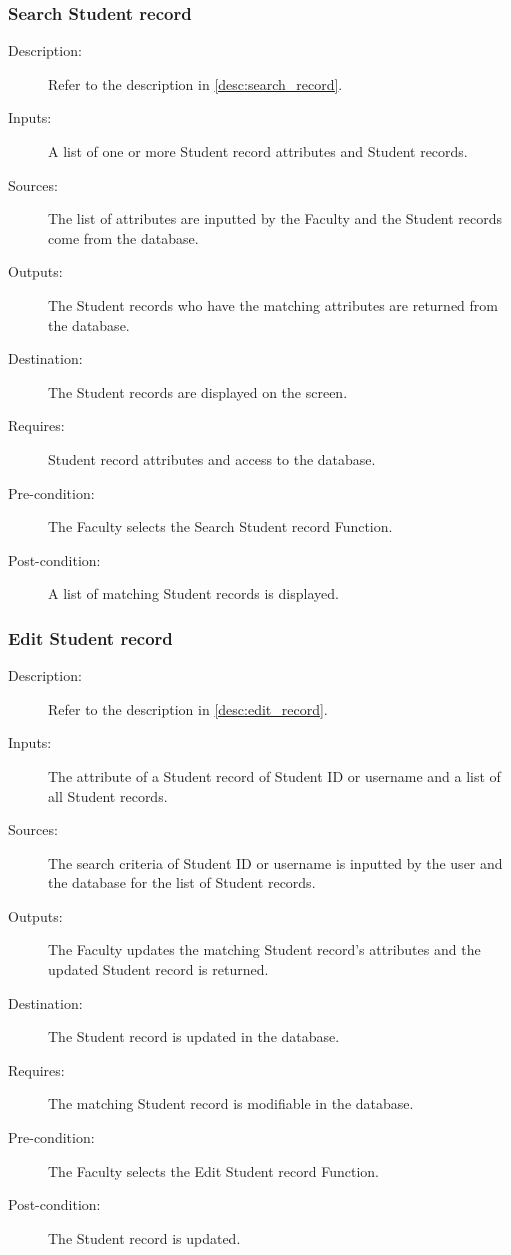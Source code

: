 \subsubsection{\large Search Student record} 
\begin{boxed} %
\begin{description}
\item[Description:]
   Refer to the description in \autoref{desc:search_record}.
\item[Inputs:]
   A list of one or more Student record attributes and Student records.
\item[Sources:]
   The list of attributes are inputted by the Faculty and the Student records
   come from the database.
\item[Outputs:]
   The Student records who have the matching attributes are returned from the
   database.
\item[Destination:]
   The Student records are displayed on the screen.
\item[Requires:]
   Student record attributes and access to the database.
\item[Pre-condition:]
   The Faculty selects the Search Student record Function.
\item[Post-condition:]
   A list of matching Student records is displayed.
\end{description}
\end{boxed} %

\subsubsection{\large Edit Student record} 
\begin{boxed} %
\begin{description}
\item[Description:]
   Refer to the description in \autoref{desc:edit_record}.
\item[Inputs:]
   The attribute of a Student record of Student ID or username and a list of all
   Student records.
\item[Sources:]
   The search criteria of Student ID or username is inputted by the user and the
   database for the list of Student records.
\item[Outputs:]
   The Faculty updates the matching Student record's attributes and the updated
   Student record is returned.
\item[Destination:]
   The Student record is updated in the database.
\item[Requires:]
   The matching Student record is modifiable in the database.
\item[Pre-condition:]
   The Faculty selects the Edit Student record Function.
\item[Post-condition:]
   The Student record is updated.
\end{description}
\end{boxed} %


